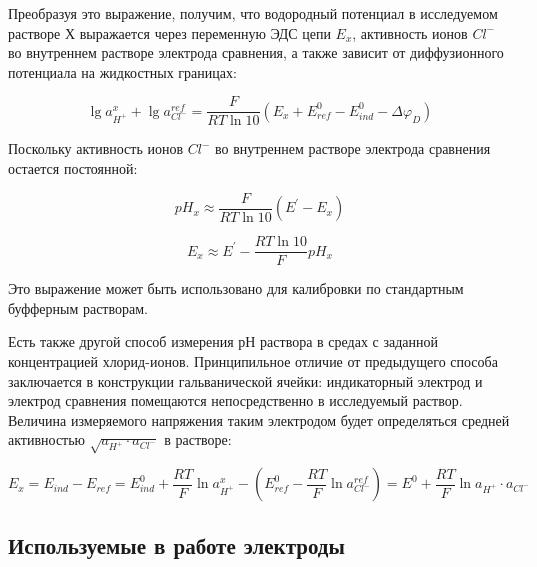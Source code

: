 \documentclass[a4paper,12pt]{article}
\begin{document}
Преобразуя это выражение, получим, что водородный потенциал в исследуемом
растворе Х выражается через переменную ЭДС цепи $E_{x}$, активность ионов $Cl^{-}$ во внутреннем растворе электрода сравнения, а также зависит от диффузионного потенциала на жидкостных границах:

\[
\lg a^{x}_{H^{+}} + \lg a^{ref}_{Cl^{-}}= \frac{F}{RT\ln 10}(E_{x} + E_{ref}^{0} - E_{ind}^{0} - \Delta \varphi_{D} )
\]

Поскольку активность ионов $Cl^{-}$ во внутреннем растворе электрода сравнения остается постоянной:

\[
pH_{x} \approx \frac{F}{RT\ln 10}(E^{'} - E_{x})
\]

\[
 E_{x} \approx E^{'} - \frac{RT\ln 10}{F}pH_{x}
\]

Это выражение может быть использовано для калибровки по стандартным буфферным растворам.

Есть также другой способ измерения рН раствора в средах с заданной концентрацией хлорид-ионов. Принципильное отличие от предыдущего способа заключается в конструкции гальванической ячейки: индикаторный электрод и электрод сравнения помещаются непосредственно в исследуемый раствор. 
Величина измеряемого напряжения таким электродом будет определяться средней активностью $\sqrt{a_{H^{+}}\cdot a_{Cl^{-}}}$ в растворе:

\begin{equation}
E_{x} = E_{ind} - E_{ref} =  E_{ind}^{0} + \frac{RT}{F}\ln a^{x}_{H^{+}} - (E_{ref}^{0} - \frac{RT}{F}\ln a^{ref}_{Cl^{-}}) = E^{0} + \frac{RT}{F} \ln a_{H^{+}}\cdot a_{Cl^{-}} 
\end{equation}





\subsection{Используемые в работе электроды}
\end{document}
